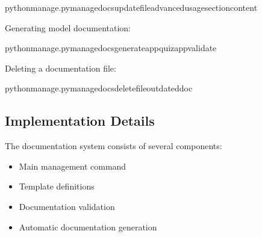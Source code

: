 \documentclass[letterpaper,10pt,english]{sphinxmanual}
\begin{document}
\begin{sphinxVerbatim}[commandchars=\\\{\}]
pythonmanage.pymanage\PYGZus{}docsupdate\PYGZhy{}\PYGZhy{}fileadvanced\PYGZus{}usage\PYGZhy{}\PYGZhy{}section\PYGZhy{}\PYGZhy{}content
\end{sphinxVerbatim}

\sphinxAtStartPar
Generating model documentation:

\begin{sphinxVerbatim}[commandchars=\\\{\}]
pythonmanage.pymanage\PYGZus{}docsgenerate\PYGZhy{}\PYGZhy{}appquiz\PYGZus{}app\PYGZhy{}\PYGZhy{}validate
\end{sphinxVerbatim}

\sphinxAtStartPar
Deleting a documentation file:

\begin{sphinxVerbatim}[commandchars=\\\{\}]
pythonmanage.pymanage\PYGZus{}docsdelete\PYGZhy{}\PYGZhy{}fileoutdated\PYGZus{}doc
\end{sphinxVerbatim}


\subsection{Implementation Details}
\label{\detokenize{documentation_tools:implementation-details}}
\sphinxAtStartPar
The documentation system consists of several components:
\begin{itemize}
\item {} 
\sphinxAtStartPar
{} \sphinxhyphen{} Main management command

\item {} 
\sphinxAtStartPar
{} \sphinxhyphen{} Template definitions

\item {} 
\sphinxAtStartPar
{} \sphinxhyphen{} Documentation validation

\item {} 
\sphinxAtStartPar
{} \sphinxhyphen{} Automatic documentation generation

\end{itemize}
\end{document}

